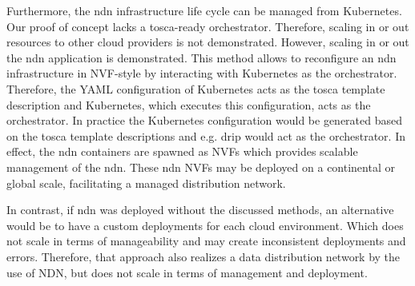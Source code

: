 Furthermore, the \gls{ndn} infrastructure life cycle can be managed from Kubernetes. Our proof of concept lacks a \gls{tosca}-ready orchestrator. Therefore, scaling in or out resources to other cloud providers is not demonstrated. However, scaling in or out the \gls{ndn} application is demonstrated. This method allows to reconfigure an \gls{ndn} infrastructure in NVF-style by interacting with Kubernetes as the orchestrator. Therefore, the YAML configuration of Kubernetes acts as the \gls{tosca} template description and Kubernetes, which executes this configuration, acts as the orchestrator. In practice the Kubernetes configuration would be generated based on the \gls{tosca} template descriptions and e.g. \gls{drip} would act as the orchestrator. In effect, the \gls{ndn} containers are spawned as NVFs which provides scalable management of the \gls{ndn}. These \gls{ndn} NVFs may be deployed on a continental or global scale, facilitating a managed distribution network.

In contrast, if \gls{ndn} was deployed without the discussed methods, an alternative would be to have a custom deployments for each cloud environment. Which does not scale in terms of manageability and may create inconsistent deployments and errors. Therefore, that approach also realizes a data distribution network by the use of NDN, but does not scale in terms of management and deployment.